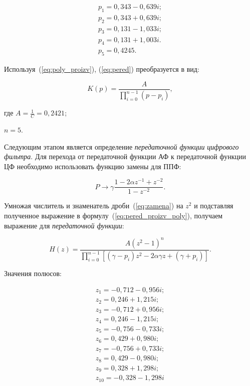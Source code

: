 \begin{gather*}
  p_1 = 0{,}343 - 0{,}639i;\\
  p_2 = 0{,}343 + 0{,}639i;\\
  p_3 = 0{,}131 - 1{,}033i;\\
  p_4 = 0{,}131 + 1{,}003i.\\
  p_5 = 0{,}4245.
\end{gather*}

Используя~(\ref{eq:poly_proizv}), (\ref{eq:pered}) преобразуется в
вид:

\begin{equation}
  \label{eq:pered_proizv_poly}
  K(p) = \frac{A}{\prod_{i=0}^{n-1}(p-p_i)},
\end{equation}

\begin{ESKDexplanation}
\item[где ] $A = \frac{1}{C} = 0{,}2421$;
\item $n = 5$.
\end{ESKDexplanation}

\point Следующим этапом является определение \textit{передаточной
  функции} \emph{цифрового фильтра}. Для перехода от передаточной
функции АФ к передаточной функции ЦФ необходимо использовать функцию
замены для ППФ:

\begin{equation}
  \label{eq:zamena}
  P  \rightarrow \gamma \frac{1 - 2 \alpha z^{-1}+z^{-2}}{1-z^{-2}}.
\end{equation}

Умножая числитель и знаменатель дроби~(\ref{eq:zamena}) на $z^2$ и
подставляя полученное выражение в
формулу~(\ref{eq:pered_proizv_poly}), получаем выражение для
\textit{передаточной функции}:

\begin{equation*}
  H(z) = \frac{A(z^2-1)^n}{\displaystyle \prod_{i=0}^{n-1}\left[(\gamma - p_i)z^2 - 2
      \alpha \gamma z + (\gamma + p_i)\right]}.
\end{equation*}

\point Значения полюсов:

\begin{align*}
  z_{1}= -0{,}712 - 0{,}956i;\\
  z_{2}= 0{,}246 + 1{,}215i;\\
  z_{3}= -0{,}712 + 0{,}956i;\\
  z_{4}= 0{,}246 - 1{,}215i;\\
  z_{5}= -0{,}756 - 0{,}733i;\\
  z_{6}= 0{,}429 + 0{,}980i;\\
  z_{7}= -0{,}756 + 0{,}733i;\\
  z_{8}= 0{,}429 - 0{,}980i;\\
  z_{9}= 0{,}328 + 1{,}298i;\\
  z_{10} = -0{,}328 - 1{,}298i
\end{align*}

